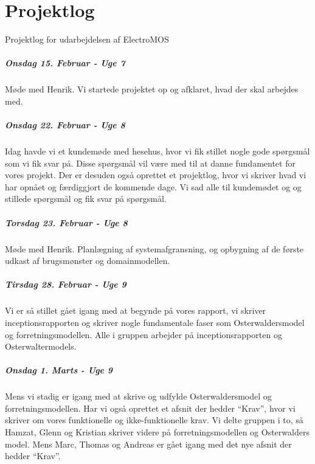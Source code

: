 \chapter{Projektlog}
Projektlog for udarbejdelsen af ElectroMOS
 
\paragraph{Onsdag 15. Februar - Uge 7}
Møde med Henrik. Vi startede projektet op og afklaret, hvad der skal arbejdes med.
 
\paragraph{Onsdag 22. Februar - Uge 8}
Idag havde vi et kundemøde med hesehus, hvor vi fik stillet nogle gode spørgsmål som vi fik svar på. Disse spørgsmål vil være med til at danne fundamentet for vores projekt. Der er desuden også oprettet et projektlog, hvor vi skriver hvad vi har opnået og færdiggjort de kommende dage.
Vi sad alle til kundemødet og og stillede spørgsmål og fik svar på spørgsmål.
 
\paragraph{Torsdag 23. Februar - Uge 8}
Møde med Henrik. Planlægning af systemafgransning, og opbygning af de første udkast af brugsmønster og domainmodellen.
 
\paragraph{Tirsdag 28. Februar - Uge 9}
Vi er så stillet gået igang med at begynde på vores rapport, vi skriver inceptionsrapporten og skriver nogle fundamentale faser som Osterwaldersmodel og forretningsmodellen.
Alle i gruppen arbejder på inceptionsrapporten og Osterwaltermodels.
 
\paragraph{Onsdag 1. Marts - Uge 9}
Mens vi stadig er igang med at skrive og udfylde Osterwaldersmodel og forretningsmodellen. Har vi også oprettet et afsnit der hedder “Krav”, hvor vi skriver om vores funktionelle og ikke-funktionelle krav.
Vi delte gruppen i to, så Hamzat, Glenn og Kristian skriver videre på forretningsmodellen og Osterwalders model. Mens Marc, Thomas og Andreas er gået igang med det nye afsnit der hedder “Krav”.
 
